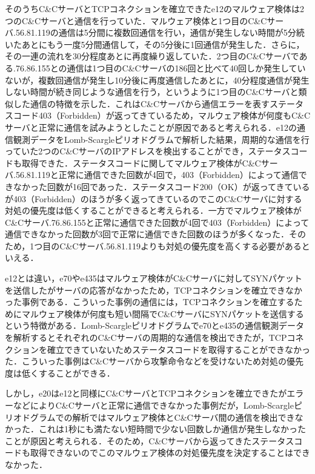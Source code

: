 \documentclass[twocolumn]{ltjsarticle}
\begin{document}
そのうちC\&CサーバとTCPコネクションを確立できたe12のマルウェア検体は2つのC\&Cサーバと通信を行っていた．マルウェア検体と1つ目のC\&Cサーバ\ast\ast\ast.56.81.119の通信は5分間に複数回通信を行い，通信が発生しない時間が5分続いたあとにもう一度5分間通信して，その5分後に1回通信が発生した．さらに，その一連の流れを30分程度あとに再度繰り返していた．2つ目のC\&Cサーバである\ast\ast\ast.76.86.155との通信は1つ目のC\&Cサーバの186回と比べて40回しか発生していないが，複数回通信が発生し10分後に再度通信したあとに，40分程度通信が発生しない時間が続き同じような通信を行う，というように1つ目のC\&Cサーバと類似した通信の特徴を示した．これはC\&Cサーバから通信エラーを表すステータスコード403（Forbidden）が返ってきているため，マルウェア検体が何度もC\&Cサーバと正常に通信を試みようとしたことが原因であると考えられる．e12の通信観測データをLomb-Scargleピリオドグラムで解析した結果，周期的な通信を行っていた2つのC\&CサーバのIPアドレスを検出することができ，ステータスコードも取得できた．ステータスコードに関してマルウェア検体がC\&Cサーバ\ast\ast\ast.56.81.119と正常に通信できた回数が4回で，403（Forbidden）によって通信できなかった回数が16回であった．ステータスコード200（OK）が返ってきているが403（Forbidden）のほうが多く返ってきているのでこのC\&Cサーバに対する対処の優先度は低くすることができると考えられる．一方でマルウェア検体がC\&Cサーバ\ast\ast\ast.76.86.155と正常に通信できた回数が4回で403（Forbidden）によって通信できなかった回数が3回で正常に通信できた回数のほうが多くなった．そのため，1つ目のC\&Cサーバ\ast\ast\ast.56.81.119よりも対処の優先度を高くする必要があるといえる．

e12とは違い，e70やe435はマルウェア検体がC\&Cサーバに対してSYNパケットを送信したがサーバの応答がなかったため，TCPコネクションを確立できなかった事例である．こういった事例の通信には，TCPコネクションを確立するためにマルウェア検体が何度も短い間隔でC\&CサーバにSYNパケットを送信するという特徴がある．Lomb-Scargleピリオドグラムでe70とe435の通信観測データを解析するとそれぞれのC\&Cサーバの周期的な通信を検出できたが，TCPコネクションを確立できていないためステータスコードを取得することができなかった．こういった事例はC\&Cサーバから攻撃命令などを受けないため対処の優先度は低くすることができる．

しかし，e20はe12と同様にC\&CサーバとTCPコネクションを確立できたがエラーなどによりC\&Cサーバと正常に通信できなかった事例だが，Lomb-Scargleピリオドグラムでの解析ではマルウェア検体とC\&Cサーバ間の通信を検出できなかった．これは1秒にも満たない短時間で少ない回数しか通信が発生しなかったことが原因と考えられる．そのため，C\&Cサーバから返ってきたステータスコードも取得できないのでこのマルウェア検体の対処優先度を決定することはできなかった．
\end{document}
